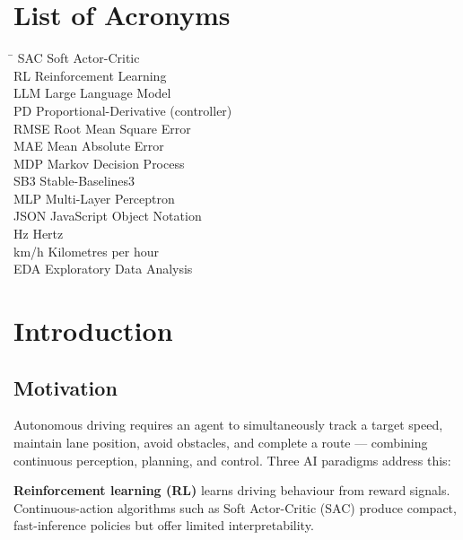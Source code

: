 \documentclass[12pt,a4paper]{report}
\begin{document}
\chapter*{List of Acronyms}
\begin{tabbing}
\hspace{3cm}\=\kill
SAC   \> Soft Actor-Critic \\
RL    \> Reinforcement Learning \\
LLM   \> Large Language Model \\
PD    \> Proportional-Derivative (controller) \\
RMSE  \> Root Mean Square Error \\
MAE   \> Mean Absolute Error \\
MDP   \> Markov Decision Process \\
SB3   \> Stable-Baselines3 \\
MLP   \> Multi-Layer Perceptron \\
JSON  \> JavaScript Object Notation \\
Hz    \> Hertz \\
km/h  \> Kilometres per hour \\
EDA   \> Exploratory Data Analysis \\
\end{tabbing}
\clearpage

\setcounter{page}{1}

\chapter{Introduction}

\section{Motivation}

Autonomous driving requires an agent to simultaneously track a target speed, maintain lane position, avoid obstacles, and complete a route — combining continuous perception, planning, and control. Three AI paradigms address this:

\textbf{Reinforcement learning (RL)} learns driving behaviour from reward signals. Continuous-action algorithms such as Soft Actor-Critic (SAC) produce compact, fast-inference policies but offer limited interpretability.
\end{document}

